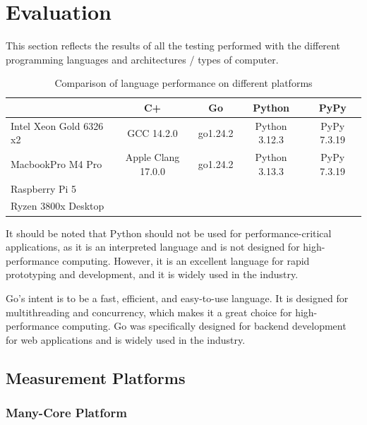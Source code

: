 \chapter{Evaluation}\label{chap:evaluation}

This section reflects the results of all the testing performed with the different programming languages and architectures / types of computer.

\begin{table}[ht]
  \centering
  \begin{tabular}{lcccc}
    \toprule
                            & C\++                  & Go        & Python        & PyPy \\
    \midrule
    Intel Xeon Gold 6326 x2 &  GCC 14.2.0           & go1.24.2  & Python 3.12.3 & PyPy 7.3.19 \\
    MacbookPro M4 Pro       &  Apple Clang 17.0.0   & go1.24.2  & Python 3.13.3 & PyPy 7.3.19 \\
    Raspberry Pi 5          &                       &           &               &             \\
    Ryzen 3800x Desktop     &                       &           &               &             \\
    \bottomrule
  \end{tabular}
  \caption{Comparison of language performance on different platforms}
  \label{tab:lang-platforms}
\end{table}

It should be noted that Python should not be used for performance-critical applications, as it is an interpreted language and is not designed for high-performance computing. However, it is an excellent language for rapid prototyping and development, and it is widely used in the industry.

Go's intent is to be a fast, efficient, and easy-to-use language. It is designed for multithreading and concurrency, which makes it a great choice for high-performance computing. Go was specifically designed for backend development for web applications and is widely used in the industry.

\section{Measurement Platforms}

\subsection{Many-Core Platform}

